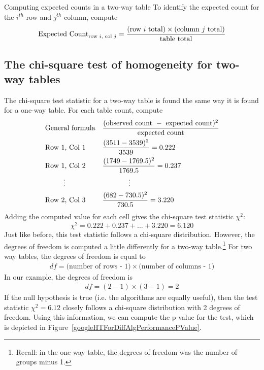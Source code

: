 \begin{onebox}{Computing expected counts in a two-way table}
To identify the expected count for the $i^{th}$ row and $j^{th}$ column, compute
$$\text{Expected Count}_{\text{row }i,\text{ col }j} = \frac{(\text{row $i$ total}) \times  (\text{column $j$ total})}{\text{table total}}\vspace{2mm}$$\end{onebox}


\subsection{The chi-square test of homogeneity for two-way tables}

The chi-square test statistic for a two-way table is found the same way it is found for a one-way table. For each table count, compute
\begin{align*}
&\text{General formula}& &\frac{(\text{observed count } - \text{ expected count})^2}{\text{expected count}} \\
&\text{Row 1, Col 1}& &\frac{(3511 - 3539)^2}{3539} = 0.222 \\
&\text{Row 1, Col 2}& &\frac{(1749 - 1769.5)^2}{1769.5} = 0.237 \\
& \hspace{9mm}\vdots & &\hspace{13mm}\vdots \\
&\text{Row 2, Col 3}& &\frac{(682 - 730.5)^2}{730.5} = 3.220
\end{align*}
Adding the computed value for each cell gives the chi-square test statistic $\chi^2$:
$$\chi^2 = 0.222 + 0.237 + \dots + 3.220 = 6.120$$
Just like before, this test statistic follows a chi-square distribution. However, the degrees of freedom is computed a little differently for a two-way table.\footnote{Recall: in the one-way table, the degrees of freedom was the number of groups minus 1.} For two way tables, the degrees of freedom is equal to
\begin{align*}
df = \text{(number of rows - 1)}\times \text{(number of columns - 1)}
\end{align*}
In our example, the degrees of freedom is
\begin{align*}
df = (2-1)\times (3-1) = 2
\end{align*}
If the null hypothesis is true (i.e. the algorithms are equally useful), then the test statistic $\chi^2 = 6.12$ closely follows a chi-square distribution with 2 degrees of freedom. Using this information, we can compute the p-value for the test, which is depicted in Figure~\ref{googleHTForDiffAlgPerformancePValue}.


